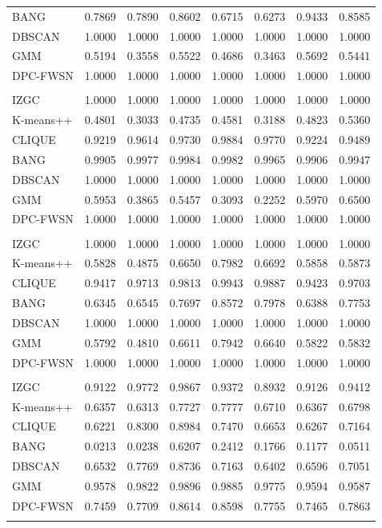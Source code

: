 \begin{table}[ht!]
\begin{tabular*}{\linewidth}{@{} lccccccc @{}}
BANG & 0.7869 & 0.7890 & 0.8602 & 0.6715 & 0.6273 & 0.9433 & 0.8585 \\
DBSCAN & 1.0000 & 1.0000 & 1.0000 & 1.0000 & 1.0000 & 1.0000 & 1.0000 \\
GMM & 0.5194 & 0.3558 & 0.5522 & 0.4686 & 0.3463 & 0.5692 & 0.5441 \\
DPC-FWSN & 1.0000 & 1.0000 & 1.0000 & 1.0000 & 1.0000 & 1.0000 & 1.0000 \\
\addlinespace
\addlinespace
\multicolumn{8}{l}{\textbf{Ls}} \\
IZGC & 1.0000 & 1.0000 & 1.0000 & 1.0000 & 1.0000 & 1.0000 & 1.0000 \\
K-means++ & 0.4801 & 0.3033 & 0.4735 & 0.4581 & 0.3188 & 0.4823 & 0.5360 \\
CLIQUE & 0.9219 & 0.9614 & 0.9730 & 0.9884 & 0.9770 & 0.9224 & 0.9489 \\
BANG & 0.9905 & 0.9977 & 0.9984 & 0.9982 & 0.9965 & 0.9906 & 0.9947 \\
DBSCAN & 1.0000 & 1.0000 & 1.0000 & 1.0000 & 1.0000 & 1.0000 & 1.0000 \\
GMM & 0.5953 & 0.3865 & 0.5457 & 0.3093 & 0.2252 & 0.5970 & 0.6500 \\
DPC-FWSN & 1.0000 & 1.0000 & 1.0000 & 1.0000 & 1.0000 & 1.0000 & 1.0000 \\
\addlinespace
\addlinespace
\multicolumn{8}{l}{\textbf{LineBlobs}} \\
IZGC & 1.0000 & 1.0000 & 1.0000 & 1.0000 & 1.0000 & 1.0000 & 1.0000 \\
K-means++ & 0.5828 & 0.4875 & 0.6650 & 0.7982 & 0.6692 & 0.5858 & 0.5873 \\
CLIQUE & 0.9417 & 0.9713 & 0.9813 & 0.9943 & 0.9887 & 0.9423 & 0.9703 \\
BANG & 0.6345 & 0.6545 & 0.7697 & 0.8572 & 0.7978 & 0.6388 & 0.7753 \\
DBSCAN & 1.0000 & 1.0000 & 1.0000 & 1.0000 & 1.0000 & 1.0000 & 1.0000 \\
GMM & 0.5792 & 0.4810 & 0.6611 & 0.7942 & 0.6640 & 0.5822 & 0.5832 \\
DPC-FWSN & 1.0000 & 1.0000 & 1.0000 & 1.0000 & 1.0000 & 1.0000 & 1.0000 \\
\addlinespace
\addlinespace
\multicolumn{8}{l}{\textbf{3c}} \\
IZGC & 0.9122 & 0.9772 & 0.9867 & 0.9372 & 0.8932 & 0.9126 & 0.9412 \\
K-means++ & 0.6357 & 0.6313 & 0.7727 & 0.7777 & 0.6710 & 0.6367 & 0.6798 \\
CLIQUE & 0.6221 & 0.8300 & 0.8984 & 0.7470 & 0.6653 & 0.6267 & 0.7164 \\
BANG & 0.0213 & 0.0238 & 0.6207 & 0.2412 & 0.1766 & 0.1177 & 0.0511 \\
DBSCAN & 0.6532 & 0.7769 & 0.8736 & 0.7163 & 0.6402 & 0.6596 & 0.7051 \\
GMM & 0.9578 & 0.9822 & 0.9896 & 0.9885 & 0.9775 & 0.9594 & 0.9587 \\
DPC-FWSN & 0.7459 & 0.7709 & 0.8614 & 0.8598 & 0.7755 & 0.7465 & 0.7863 \\
\addlinespace
\bottomrule
\end{tabular*}
\end{table}